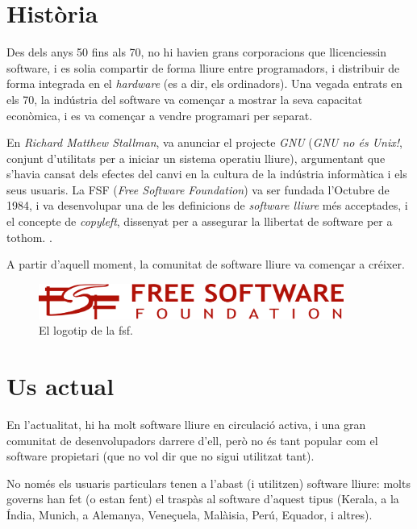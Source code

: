 \section{Història}

Des dels anys 50 fins als 70, no hi havien grans corporacions que 
llicenciessin software, i es solia compartir de forma lliure entre
programadors, i distribuir de forma integrada en el \emph{hardware}
(es a dir, els ordinadors). Una vegada entrats en els 70, la indústria del
software va començar a mostrar la seva capacitat econòmica, i es va
començar a vendre programari per separat. \cite{ibmusdata}

En \emph{Richard Matthew Stallman}, va anunciar el projecte \emph{GNU} (\emph{GNU no és Unix!}, conjunt d'utilitats per a iniciar un sistema operatiu lliure), argumentant que s'havia cansat dels efectes del canvi en la cultura de la indústria informàtica i els seus usuaris. La FSF (\emph{Free Software Foundation}) va ser fundada l'Octubre de 1984, i va desenvolupar una de les definicions de \emph{software lliure} més acceptades, i el concepte de \emph{copyleft}, dissenyat per a assegurar la llibertat de software per a tothom. \cite{fossieee}.

A partir d'aquell moment, la comunitat de software lliure va començar a créixer.

\begin{figure}[ht!]
\centering
\includegraphics[width=100mm]{data/fsf.png}
\caption{El logotip de la \ac{fsf}.}
\label{fsfpic}
\end{figure}

\section{Us actual}

En l'actualitat, hi ha molt software lliure en circulació activa, i una gran comunitat de desenvolupadors darrere d'ell, però no és tant popular com el software propietari (que no vol dir que no sigui utilitzat tant).

No només els usuaris particulars tenen a l'abast (i utilitzen) software lliure: molts governs han fet (o estan fent) el traspàs al software d'aquest tipus (Kerala, a la Índia, Munich, a Alemanya, Veneçuela, Malàisia, Perú, Equador, i altres). \cite{fossadopters}

